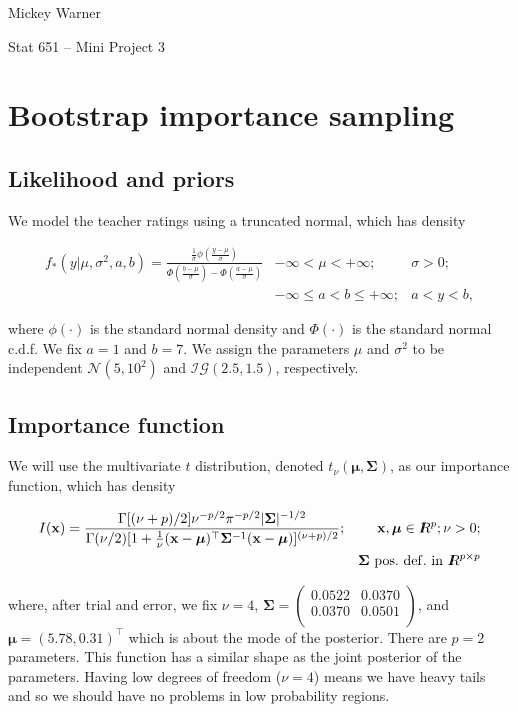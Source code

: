 \documentclass[12pt]{article}
\newcommand{\m}[1]{\mathbf{\bm{#1}}}
\newcommand{\R}{I\hspace{-4.4pt}R}
\begin{document}
\noindent Mickey Warner

\noindent Stat 651 -- Mini Project 3

\section{Bootstrap importance sampling}

\subsection{Likelihood and priors}

\noindent We model the teacher ratings using a truncated normal, which has density

\begin{eqnarray*}
f_*(y|\mu,\sigma^2,a,b) = \frac{\frac{1}{\sigma}\phi(\frac{y-\mu}{\sigma})}{\Phi(\frac{b-\mu}{\sigma})-\Phi(\frac{a-\mu}{\sigma})} & -\infty < \mu < +\infty; & \sigma > 0; \\
& -\infty \leq a < b \leq +\infty; & a < y < b,
\end{eqnarray*}

\noindent where $\phi(\cdot)$ is the standard normal density and $\Phi(\cdot)$ is the standard normal c.d.f. We fix $a=1$ and $b=7$. We assign the parameters $\mu$ and $\sigma^2$ to be independent $\mathcal{N}(5, 10^2)$ and $\mathcal{IG}(2.5, 1.5)$, respectively.

\subsection{Importance function}

\noindent We will use the multivariate $t$ distribution, denoted $t_\nu(\m{\mu}, \m{\Sigma})$, as our importance function, which has density

\begin{eqnarray*}
I(\m{x}) = \frac{\Gamma[(\nu+p)/2]\nu^{-p/2}\pi^{-p/2}|\m{\Sigma}|^{-1/2}}{\Gamma(\nu/2)[1+\frac{1}{\nu}(\m{x}-\m{\mu})^\top\m{\Sigma}^{-1}(\m{x}-\m{\mu})]^{(\nu+p)/2}}; && \m{x}, \m{\mu} \in \R^p; \nu>0; \\
&& \m{\Sigma}~\mathrm{pos.~def.~in~} \R^{p\times p}
\end{eqnarray*}

\noindent where, after trial and error, we fix $\nu = 4$, $\m{\Sigma} = \left(\begin{array}{ll} 0.0522 & 0.0370 \\ 0.0370 & 0.0501 \\ \end{array}\right)$, and $\m{\mu}=(5.78, 0.31)^\top$ which is about the mode of the posterior. There are $p=2$ parameters. This function has a similar shape as the joint posterior of the parameters. Having low degrees of freedom ($\nu=4$) means we have heavy tails and so we should have no problems in low probability regions.
\end{document}
